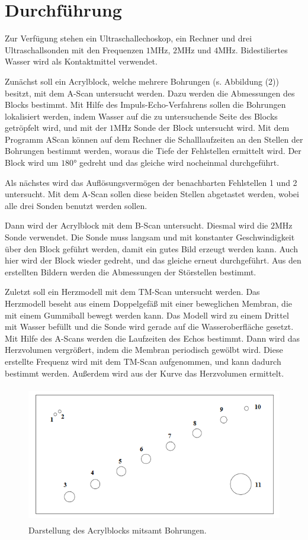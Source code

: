 \section{Durchführung}
\label{sec:Durchführung}

Zur Verfügung stehen ein Ultraschallechoskop, ein Rechner und drei Ultraschallsonden mit den Frequenzen $1 \si{\mega\hertz}$, $2 \si{\mega\hertz}$ und $4 \si{\mega\hertz}$.
Bidestiliertes Wasser wird als Kontaktmittel verwendet. 


\noindent Zunächst soll ein Acrylblock, welche mehrere Bohrungen (s. Abbildung (2)) besitzt, mit dem A-Scan untersucht werden. Dazu werden die Abmessungen des Blocks bestimmt.
Mit Hilfe des Impuls-Echo-Verfahrens sollen die Bohrungen lokalisiert werden, indem Wasser auf die zu untersuchende Seite des Blocks getröpfelt wird, und mit der $1 \si{\mega\hertz}$ Sonde der Block untersucht wird.
Mit dem Programm AScan können auf dem Rechner die Schalllaufzeiten an den Stellen der Bohrungen bestimmt werden, woraus die Tiefe der Fehlstellen ermittelt wird.
Der Block wird um $180°$ gedreht und das gleiche wird nocheinmal durchgeführt.

\noindent Als nächstes wird das Auflösungsvermögen der benachbarten Fehlstellen 1 und 2 untersucht. Mit dem A-Scan sollen diese beiden Stellen abgetastet werden, wobei alle drei Sonden benutzt werden sollen.


\noindent Dann wird der Acrylblock mit dem B-Scan untersucht. Diesmal wird die $2 \si{\mega\hertz}$ Sonde verwendet. Die Sonde muss langsam und mit konstanter Geschwindigkeit über den Block geführt werden, damit ein gutes Bild erzeugt werden kann.
Auch hier wird der Block wieder gedreht, und das gleiche erneut durchgeführt. Aus den erstellten Bildern werden die Abmessungen der Störstellen bestimmt.


\noindent Zuletzt soll ein Herzmodell mit dem TM-Scan untersucht werden. Das Herzmodell beseht aus einem Doppelgefäß mit einer beweglichen Membran, die mit einem Gummiball bewegt werden kann.
Das Modell wird zu einem Drittel mit Wasser befüllt und die Sonde wird gerade auf die Wasseroberfläche gesetzt. Mit Hilfe des A-Scans werden die Laufzeiten des Echos bestimmt.
Dann wird das Herzvolumen vergrößert, indem die Membran periodisch gewölbt wird.
Diese erstellte Frequenz wird mit dem TM-Scan aufgenommen, und kann dadurch bestimmt werden. Außerdem wird aus der Kurve das Herzvolumen ermittelt.
\begin{figure}[H]
  \centering
  \includegraphics[height=6cm]{acryl.png}
  \caption{Darstellung des Acrylblocks mitsamt Bohrungen. \cite[S.4]{kent}}
\end{figure}